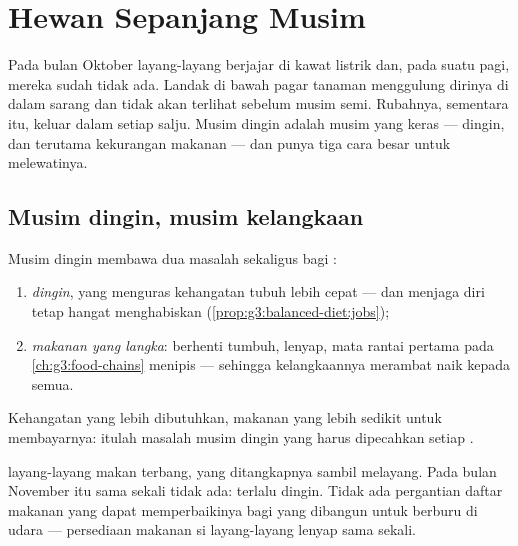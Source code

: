 \chapter{Hewan Sepanjang Musim}\label{ch:g3:animals-through-seasons}

Pada bulan Oktober  layang-layang berjajar di kawat listrik dan,
pada suatu pagi, mereka sudah tidak ada. Landak di bawah pagar tanaman
menggulung dirinya di dalam sarang  dan tidak akan terlihat
sebelum musim semi. Rubahnya, sementara itu, keluar dalam setiap
salju. Musim dingin adalah musim yang keras --- dingin, dan terutama
kekurangan makanan --- dan  punya tiga cara besar untuk
melewatinya.

\section{Musim dingin, musim kelangkaan}

\begin{proposition}\label{prop:g3:animals-through-seasons:problem}
Musim dingin membawa dua masalah sekaligus bagi :
\begin{enumerate}
  \item \emph{dingin}, yang menguras kehangatan tubuh lebih cepat ---
        dan menjaga diri tetap hangat menghabiskan 
        (\cref{prop:g3:balanced-diet:jobs});
  \item \emph{makanan yang langka}:  berhenti tumbuh, 
        lenyap, mata rantai pertama  pada
        \cref{ch:g3:food-chains} menipis --- sehingga kelangkaannya
        merambat naik kepada semua.
\end{enumerate}
Kehangatan yang lebih dibutuhkan, makanan yang lebih sedikit untuk
membayarnya: itulah masalah musim dingin yang harus dipecahkan setiap
.
\end{proposition}
\admitted

\begin{example}\label{ex:g3:animals-through-seasons:insects}
 layang-layang makan  terbang, yang ditangkapnya sambil
melayang. Pada bulan November  itu sama sekali tidak ada:
terlalu dingin. Tidak ada pergantian daftar makanan yang dapat
memperbaikinya bagi  yang dibangun untuk berburu di udara ---
persediaan makanan si layang-layang lenyap sama sekali.
\end{example}


